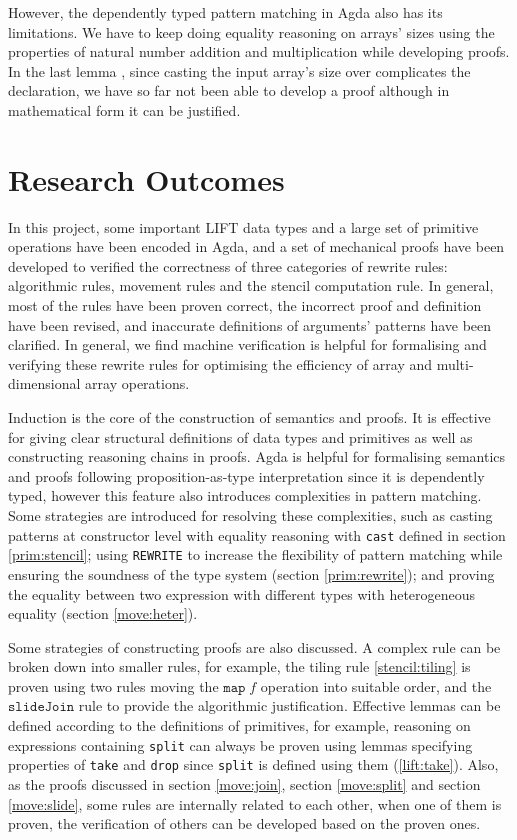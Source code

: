 \documentclass{l4proj}
\begin{document}
However, the dependently typed pattern matching in Agda also has its limitations. We have to keep doing equality reasoning on arrays' sizes using the properties of natural number addition and multiplication while developing proofs. In the last lemma , since casting the input array's size over complicates the declaration, we have so far not been able to develop a proof although in mathematical form it can be justified.

\chapter{Research Outcomes} 
\label{ch:outcomes}
In this project, some important LIFT data types and a large set of primitive operations have been encoded in Agda, and a set of mechanical proofs have been developed to verified the correctness of three categories of rewrite rules: algorithmic rules, movement rules and the stencil computation rule. In general, most of the rules have been proven correct, the incorrect proof and definition have been revised, and inaccurate definitions of arguments' patterns have been clarified. In general, we find machine verification is helpful for formalising and verifying these rewrite rules for optimising the efficiency of array and multi-dimensional array operations.

Induction is the core of the construction of semantics and proofs. It is effective for giving clear structural definitions of data types and primitives as well as constructing reasoning chains in proofs. Agda is helpful for formalising semantics and proofs following proposition-as-type interpretation since it is dependently typed, however this feature also introduces complexities in pattern matching. Some strategies are introduced for resolving these complexities, such as casting patterns at constructor level with equality reasoning with \texttt{cast} defined in section \ref{prim:stencil}; using \texttt{REWRITE} to increase the flexibility of pattern matching while ensuring the soundness of the type system (section \ref{prim:rewrite}); and proving the equality between two expression with different types with heterogeneous equality (section \ref{move:heter}).

Some strategies of constructing proofs are also discussed. A complex rule can be broken down into smaller rules, for example, the tiling rule \ref{stencil:tiling} is proven using two rules moving the $\texttt{map}\; f$ operation into suitable order, and the $\texttt{slideJoin}$ rule to provide the algorithmic justification. Effective lemmas can be defined according to the definitions of primitives, for example, reasoning on expressions containing \texttt{split} can always be proven using lemmas specifying properties of \texttt{take} and \texttt{drop} since \texttt{split} is defined using them (\ref{lift:take}). Also, as the proofs discussed in section \ref{move:join}, section \ref{move:split} and section \ref{move:slide}, some rules are internally related to each other, when one of them is proven, the verification of others can be developed based on the proven ones.
\end{document}
